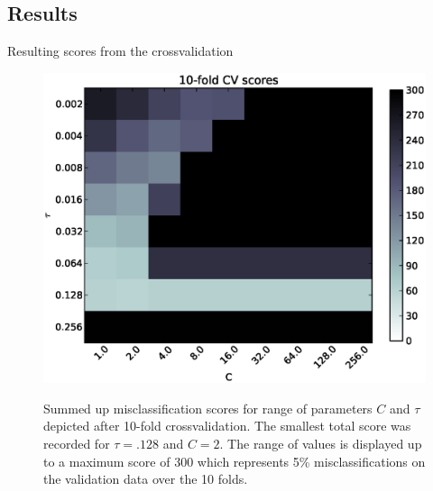 \subsection{Results}
Resulting scores from the crossvalidation
\begin{figure}[!ht]
	\centering
	\includegraphics[width=.6\textwidth]{svm/scores_max_300.eps}
	\label{fig:scores}
	\caption{Summed up misclassification scores for range of parameters $C$ and $\tau$ depicted after 10-fold crossvalidation. The smallest total score was recorded for $\tau=.128$ and $C=2$. The range of values is displayed up to a maximum score of 300 which represents 5\% misclassifications on the validation data over the 10 folds.}
\end{figure}

